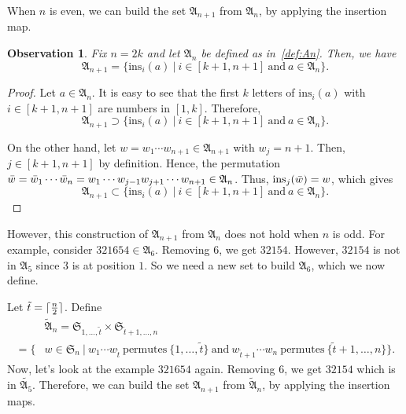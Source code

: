 \documentclass[12pt]{amsart}
\DeclarePairedDelimiter\ceil{\lceil}{\rceil}
\newtheorem{obs}[thm]{Observation}
\theoremstyle{definition}
\numberwithin{equation}{section}
\newcommand{\sn}{\mathfrak{S}_n}
\newcommand{\ins}[1]{\mathrm{ins}_{#1}}
\begin{document}
When $n$ is even, we can build the set $\mathfrak A_{n+1}$ from $\mathfrak A_n$, by applying the insertion map.

\begin{obs}\label{obs:ins on An}
    Fix $n = 2k$ and let $\mathfrak A_n$ be defined as in~\eqref{def:An}. Then, we have \begin{equation*}
        \mathfrak A_{n+1} = \{\ins {i}(a) \ | \ i\in[k+1,n+1] \ \text{and} \ a\in \mathfrak A_n \}.
    \end{equation*}
\end{obs}
\begin{proof}
    Let $a\in \mathfrak A_n$. It is easy to see that the first $k$ letters of $\ins i(a)$ with $i\in [k+1,n+1]$ are numbers in $[1,k]$. Therefore, \begin{equation*}
        \mathfrak A_{n+1} \supset \{\ins {i}(a) \ | \ i\in[k+1,n+1] \ \text{and} \ a\in \mathfrak A_n \}.
    \end{equation*}

    On the other hand, let $w=w_1\cdots w_{n+1}\in \mathfrak A_{n+1}$ with $w_j = n+1$. Then, $j\in[k+1,n+1]$ by definition. Hence, the permutation $\Bar{w} = \Bar{w}_1\cdots \Bar{w}_n=w_1\cdots w_{j-1}w_{j+1} \cdots w_{n+1} \in \mathfrak A_n$. Thus, $\ins {j}(\Bar{w}) = w$, which gives \begin{equation*}
        \mathfrak A_{n+1} \subset \{\ins {i}(a) \ | \ i\in[k+1,n+1] \ \text{and} \ a\in \mathfrak A_n \}.
    \end{equation*}
\end{proof}

However, this construction of $\mathfrak{A}_{n+1}$ from $\mathfrak{A}_n$ does not hold when $n$ is odd. For example, consider $321654 \in \mathfrak A_{6}$. Removing $6$, we get $32154$. However, $32154$ is not in $\mathfrak A_5$ since $3$ is at position $1$. So we need a new set to build $\mathfrak A_6$, which we now define.

Let $\tilde{t} = \ceil{\frac{n}{2}}$. Define \begin{equation}\label{def:tildeAn}
\begin{split}
    &\tilde{\mathfrak A}_n = \mathfrak{S}_{1, \dotsc, \tilde{t}}\times \mathfrak{S}_{\tilde{t}+1, \dotsc, n} \\
    = \{&w \in \sn \ | \ w_1\cdots w_{\tilde{t}} \ \text{permutes} \ \{1,\dotsc,\tilde{t}\} \ \text{and} \ w_{\tilde{t}+1} \cdots w_n \ \text{permutes} \ \{\tilde{t}+1,\dotsc,n\} \}.
\end{split}
    \end{equation}
    Now, let's look at the example $321654$ again. Removing $6$, we get $32154$ which is in $\tilde{\mathfrak A_5}$. Therefore, we can build the set $\mathfrak A_{n+1}$ from $\tilde{\mathfrak A}_n$, by applying the insertion maps.
\end{document}
